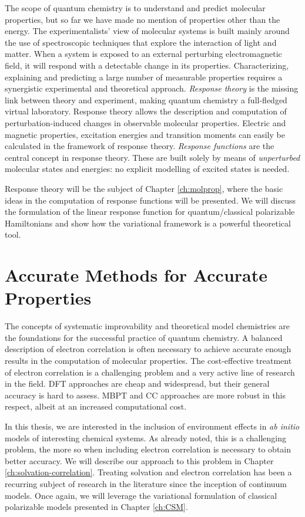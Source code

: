 The scope of quantum chemistry is to understand and predict molecular
properties, but so far we have made no mention of properties other than
the energy.
The experimentalists' view of molecular systems is built mainly around
the use of spectroscopic techniques that explore the interaction of
light and matter. When a system is exposed to an external perturbing
electromagnetic field, it will respond with a detectable change in its
properties.\autocite{Pedersen2012-il, Jaszunski2012-wy}
Characterizing, explaining and predicting a large number of measurable
properties requires a synergistic experimental and theoretical approach.
\emph{Response theory} is the missing link between theory and
experiment, making quantum chemistry a full-fledged virtual laboratory.
Response theory allows the description and computation of
perturbation-induced changes in observable molecular properties.
Electric and magnetic properties, excitation energies and transition
moments can easily be calculated in the framework of response theory.
\emph{Response functions} are the central concept in response theory.
These are built solely by means of \emph{unperturbed} molecular states and
energies: no explicit modelling of excited states is needed.

Response theory will be the subject of Chapter \ref{ch:molprop},
where the basic ideas in the computation of response functions will be
presented. We will discuss the formulation of the linear response
function for quantum/classical polarizable Hamiltonians and show how the
variational framework is a powerful theoretical tool.

\section*{Accurate Methods for Accurate Properties}

The concepts of systematic improvability and theoretical model
chemistries are the foundations for the successful practice of quantum
chemistry.
A balanced description of electron correlation is often necessary
to achieve accurate enough results in the computation of molecular
properties.\autocite{Lee1995-pw, Helgaker2004-oz, Tajti2004-ye}
The cost-effective treatment of electron correlation is a challenging
problem and a very active line of research in the field.
\Acrlong*{DFT} approaches are cheap and widespread, but their general
accuracy is hard to assess. \Acrlong*{MBPT} and \acrlong*{CC} approaches
are more robust in this respect, albeit at an increased computational
cost.

In this thesis, we are interested in the inclusion of
environment effects in \emph{ab initio} models of interesting chemical
systems. As already noted, this is a challenging problem, the more so
when including electron correlation is necessary to obtain better
accuracy.
We will describe our approach to this problem in Chapter
\ref{ch:solvation-correlation}. Treating solvation and electron
correlation has been a recurring subject of research in the literature
since the inception of continuum models. Once again, we will leverage
the variational formulation of classical polarizable models presented
in Chapter \ref{ch:CSM}.
